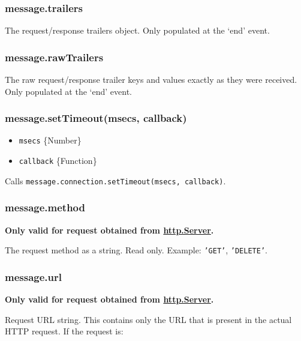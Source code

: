 \subsubsection{message.trailers}\label{message.trailers}

The request/response trailers object. Only populated at the `end' event.

\subsubsection{message.rawTrailers}\label{message.rawtrailers}

The raw request/response trailer keys and values exactly as they were
received. Only populated at the `end' event.

\subsubsection{message.setTimeout(msecs,
callback)}\label{message.settimeoutmsecs-callback}

\begin{itemize}
\itemsep1pt\parskip0pt
\item
  \texttt{msecs} \{Number\}
\item
  \texttt{callback} \{Function\}
\end{itemize}

Calls \texttt{message.connection.setTimeout(msecs, callback)}.

\subsubsection{message.method}\label{message.method}

\textbf{Only valid for request obtained from
\hyperref[httpux5fclassux5fhttpux5fserver]{http.Server}.}

The request method as a string. Read only. Example: \texttt{'GET'},
\texttt{'DELETE'}.

\subsubsection{message.url}\label{message.url}

\textbf{Only valid for request obtained from
\hyperref[httpux5fclassux5fhttpux5fserver]{http.Server}.}

Request URL string. This contains only the URL that is present in the
actual HTTP request. If the request is:

\begin{Shaded}
\begin{Highlighting}[]
\end{Highlighting}
\end{Shaded}

